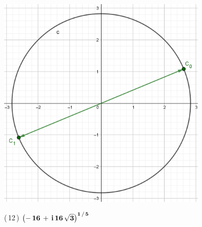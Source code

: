 \documentclass[a4paper,11pt,openany]{book}
\begin{document}
\begin{center}
    \includegraphics[width=10cm]{Gra-Ej-11.png}
\end{center}

\textcolor{ao(english)}{(\,12\,)} $\bf{\left(-\,16\,+\,i\,16\,\sqrt{3}\right)^{1\,/\,5}}$
\end{document}

